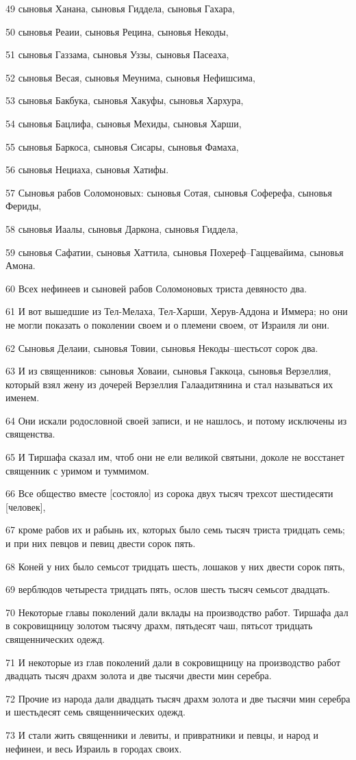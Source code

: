 \par 49 сыновья Ханана, сыновья Гиддела, сыновья Гахара,
\par 50 сыновья Реаии, сыновья Рецина, сыновья Некоды,
\par 51 сыновья Газзама, сыновья Уззы, сыновья Пасеаха,
\par 52 сыновья Весая, сыновья Меунима, сыновья Нефишсима,
\par 53 сыновья Бакбука, сыновья Хакуфы, сыновья Хархура,
\par 54 сыновья Бацлифа, сыновья Мехиды, сыновья Харши,
\par 55 сыновья Баркоса, сыновья Сисары, сыновья Фамаха,
\par 56 сыновья Нециаха, сыновья Хатифы.
\par 57 Сыновья рабов Соломоновых: сыновья Сотая, сыновья Соферефа, сыновья Фериды,
\par 58 сыновья Иаалы, сыновья Даркона, сыновья Гиддела,
\par 59 сыновья Сафатии, сыновья Хаттила, сыновья Похереф--Гаццевайима, сыновья Амона.
\par 60 Всех нефинеев и сыновей рабов Соломоновых триста девяносто два.
\par 61 И вот вышедшие из Тел-Мелаха, Тел-Харши, Херув-Аддона и Иммера; но они не могли показать о поколении своем и о племени своем, от Израиля ли они.
\par 62 Сыновья Делаии, сыновья Товии, сыновья Некоды--шестьсот сорок два.
\par 63 И из священников: сыновья Ховаии, сыновья Гаккоца, сыновья Верзеллия, который взял жену из дочерей Верзеллия Галаадитянина и стал называться их именем.
\par 64 Они искали родословной своей записи, и не нашлось, и потому исключены из священства.
\par 65 И Тиршафа сказал им, чтоб они не ели великой святыни, доколе не восстанет священник с уримом и туммимом.
\par 66 Все общество вместе [состояло] из сорока двух тысяч трехсот шестидесяти [человек],
\par 67 кроме рабов их и рабынь их, которых было семь тысяч триста тридцать семь; и при них певцов и певиц двести сорок пять.
\par 68 Коней у них было семьсот тридцать шесть, лошаков у них двести сорок пять,
\par 69 верблюдов четыреста тридцать пять, ослов шесть тысяч семьсот двадцать.
\par 70 Некоторые главы поколений дали вклады на производство работ. Тиршафа дал в сокровищницу золотом тысячу драхм, пятьдесят чаш, пятьсот тридцать священнических одежд.
\par 71 И некоторые из глав поколений дали в сокровищницу на производство работ двадцать тысяч драхм золота и две тысячи двести мин серебра.
\par 72 Прочие из народа дали двадцать тысяч драхм золота и две тысячи мин серебра и шестьдесят семь священнических одежд.
\par 73 И стали жить священники и левиты, и привратники и певцы, и народ и нефинеи, и весь Израиль в городах своих.

